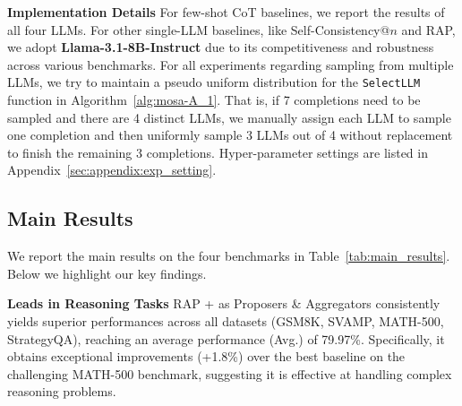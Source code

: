 \textbf{Implementation Details}
\hspace{5pt}
For few-shot CoT baselines, we report the results of all four LLMs.
For other single-LLM baselines, like Self-Consistency@$n$ and RAP, we adopt \textbf{Llama-3.1-8B-Instruct} due to its competitiveness and robustness across various benchmarks.
For all experiments regarding sampling from multiple LLMs, we try to maintain a pseudo uniform distribution for the \texttt{SelectLLM} function in Algorithm~\ref{alg:mosa-A_1}.
That is, if 7 completions need to be sampled and there are 4 distinct LLMs, we manually assign each LLM to sample one completion and then uniformly sample 3 LLMs out of 4 without replacement to finish the remaining 3 completions.
%
Hyper-parameter settings are listed in Appendix~\ref{sec:appendix:exp_setting}.












\subsection{Main Results}
\label{sec:exp:main_results}
We report the main results on the four benchmarks in Table~\ref{tab:main_results}. Below we highlight our key findings.


\textbf{\mosa{} Leads in Reasoning Tasks}\hspace{5pt}
RAP + \mosa{} as Proposers \& Aggregators consistently yields superior performances across all datasets (GSM8K, SVAMP, \mbox{MATH-500}, StrategyQA), reaching an average performance (Avg.) of 79.97\%.
Specifically, it obtains exceptional improvements (+1.8\%) over the best baseline on the challenging MATH-500 benchmark, suggesting it is effective at handling complex reasoning problems.


